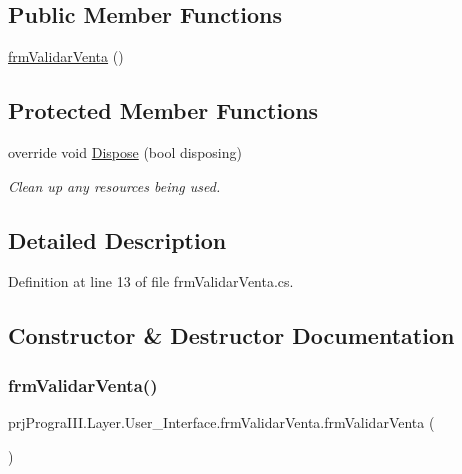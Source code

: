 \subsection*{Public Member Functions}
\begin{DoxyCompactItemize}
\item 
\hyperlink{classprj_progra_i_i_i_1_1_layer_1_1_user___interface_1_1frm_validar_venta_a65a324dcd8b6caf841fb963715badf73}{frm\+Validar\+Venta} ()
\end{DoxyCompactItemize}
\subsection*{Protected Member Functions}
\begin{DoxyCompactItemize}
\item 
override void \hyperlink{classprj_progra_i_i_i_1_1_layer_1_1_user___interface_1_1frm_validar_venta_afaac605b199f4f58c5e95b2a50a7fd0c}{Dispose} (bool disposing)
\begin{DoxyCompactList}\small\item\em Clean up any resources being used. \end{DoxyCompactList}\end{DoxyCompactItemize}


\subsection{Detailed Description}


Definition at line 13 of file frm\+Validar\+Venta.\+cs.



\subsection{Constructor \& Destructor Documentation}
\hypertarget{classprj_progra_i_i_i_1_1_layer_1_1_user___interface_1_1frm_validar_venta_a65a324dcd8b6caf841fb963715badf73}{}\label{classprj_progra_i_i_i_1_1_layer_1_1_user___interface_1_1frm_validar_venta_a65a324dcd8b6caf841fb963715badf73} 
\subsubsection{\texorpdfstring{frm\+Validar\+Venta()}{frmValidarVenta()}}
{\footnotesize\ttfamily prj\+Progra\+I\+I\+I.\+Layer.\+User\+\_\+\+Interface.\+frm\+Validar\+Venta.\+frm\+Validar\+Venta (\begin{DoxyParamCaption}{ }\end{DoxyParamCaption})}



